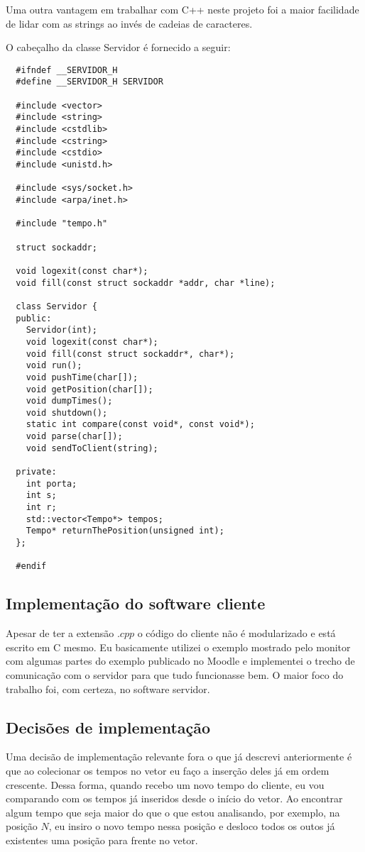 \documentclass[12pt]{article}
\begin{document}
Uma outra vantagem em trabalhar com C++ neste projeto foi a maior facilidade de
lidar com as strings ao invés de cadeias de caracteres.

O cabeçalho da classe Servidor é fornecido a seguir:

\begin{verbatim}
  #ifndef __SERVIDOR_H
  #define __SERVIDOR_H SERVIDOR

  #include <vector>
  #include <string>
  #include <cstdlib>
  #include <cstring>
  #include <cstdio>
  #include <unistd.h>

  #include <sys/socket.h>
  #include <arpa/inet.h>

  #include "tempo.h"

  struct sockaddr;

  void logexit(const char*);
  void fill(const struct sockaddr *addr, char *line);

  class Servidor {
  public:
    Servidor(int);
    void logexit(const char*);
    void fill(const struct sockaddr*, char*);
    void run();
    void pushTime(char[]);
    void getPosition(char[]);
    void dumpTimes();
    void shutdown();
    static int compare(const void*, const void*);
    void parse(char[]);
    void sendToClient(string);

  private:
    int porta;
    int s;
    int r;
    std::vector<Tempo*> tempos;
    Tempo* returnThePosition(unsigned int);
  };

  #endif
\end{verbatim}

\subsection{Implementação do software cliente}

Apesar de ter a extensão $.cpp$ o código do cliente não é modularizado e está
escrito em C mesmo. Eu basicamente utilizei o exemplo mostrado pelo monitor
com algumas partes do exemplo publicado no Moodle e implementei o trecho de
comunicação com o servidor para que tudo funcionasse bem. O maior foco do
trabalho foi, com certeza, no software servidor.

\subsection{Decisões de implementação}

Uma decisão de implementação relevante fora o que já descrevi
anteriormente é que ao colecionar os tempos no vetor eu faço a inserção deles já
em ordem crescente. Dessa forma, quando recebo um novo tempo do cliente, eu
vou comparando com os tempos já inseridos desde o início do vetor. Ao encontrar
algum tempo que seja maior do que o que estou analisando, por exemplo, na
posição $N$, eu insiro o novo tempo nessa posição e desloco todos os outos já
existentes uma posição para frente no vetor.
\end{document}
